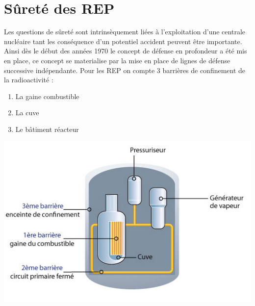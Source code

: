 \documentclass[a4paper,11pt,fleqn]{report}    %
\begin{document}
\section{Sûreté des REP}
Les questions de sûreté sont intrinsèquement liées à l'exploitation d'une centrale nucléaire tant les conséquence d'un potentiel accident peuvent être importante. Ainsi dès le début des années 1970 le concept de défense en profondeur a été mis en place, ce concept se materialise par la mise en place de lignes de défense successive indépendante. Pour les REP on compte 3 barrières de confinement de la radioactivité :
 \\
\begin{minipage}[c]{0.3\linewidth}
	\begin{enumerate}
		\item La gaine combustible
		\item La cuve
		\item Le bâtiment réacteur
	\end{enumerate}
\end{minipage} \hfill
\begin{minipage}[c]{0.65\linewidth}
	\centering
	\includegraphics[width=0.7\linewidth]{figure/irsn_barriere-confinement.png}
\end{minipage}
\vspace{0.5cm}
\end{document}
